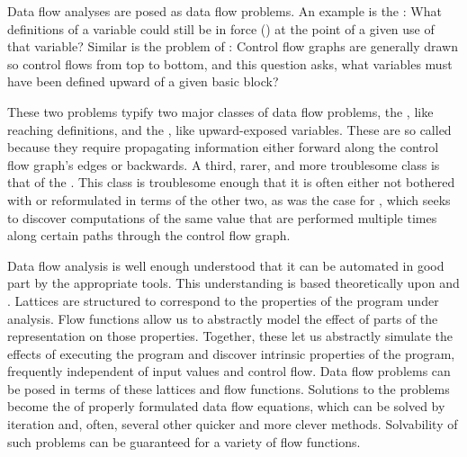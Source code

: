 Data flow analyses are posed as data flow problems. An example is the : What definitions of a variable could still be in force () at the point of a given use of that variable? Similar is the problem of : Control flow graphs are generally drawn so control flows from top to bottom, and this question asks, what variables must have been defined upward of a given basic block?

These two problems typify two major classes of data flow problems, the , like reaching definitions, and the , like upward-exposed variables. These are so called because they require propagating information either forward along the control flow graph's edges or backwards. A third, rarer, and more troublesome class is that of the . This class is troublesome enough that it is often either not bothered with or reformulated in terms of the other two, as was the case for , which seeks to discover computations of the same value that are performed multiple times along certain paths through the control flow graph.

Data flow analysis is well enough understood that it can be automated in good part by the appropriate tools. This understanding is based theoretically upon  and . Lattices are structured to correspond to the properties of the program under analysis. Flow functions allow us to abstractly model the effect of parts of the representation on those properties. Together, these let us abstractly simulate the effects of executing the program and discover intrinsic properties of the program, frequently independent of input values and control flow. Data flow problems can be posed in terms of these lattices and flow functions. Solutions to the problems become the  of properly formulated data flow equations, which can be solved by iteration and, often, several other quicker and more clever methods. Solvability of such problems can be guaranteed for a variety of flow functions.

